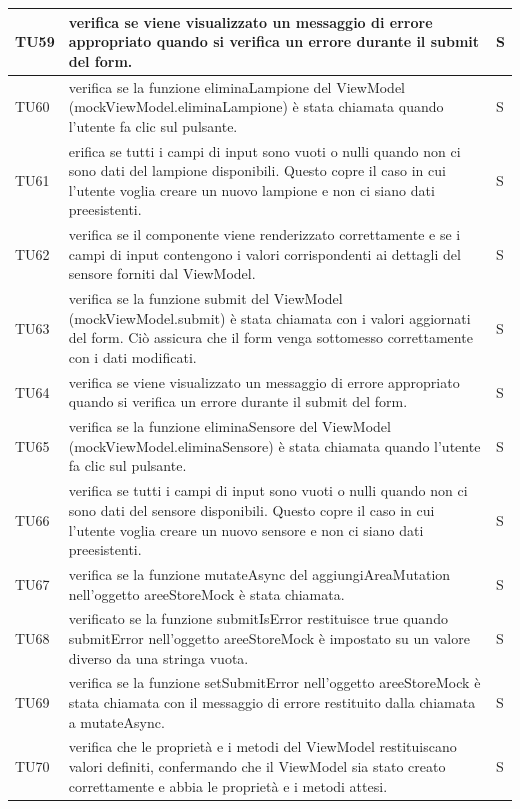 \documentclass[12pt]{article}
\begin{document}
\begin{xltabular}{\linewidth}{|>{\hsize}X|X|>{\hsize}X|}
	TU59 & verifica se viene visualizzato un messaggio di errore appropriato quando si verifica un errore durante il submit del form. & S \\ \hline
	TU60 & verifica se la funzione eliminaLampione del ViewModel (mockViewModel.eliminaLampione) è stata chiamata quando l'utente fa clic sul pulsante. & S \\ \hline
	TU61 & erifica se tutti i campi di input sono vuoti o nulli quando non ci sono dati del lampione disponibili. Questo copre il caso in cui l'utente voglia creare un nuovo lampione e non ci siano dati preesistenti. & S \\ \hline
	TU62 & verifica se il componente viene renderizzato correttamente e se i campi di input contengono i valori corrispondenti ai dettagli del sensore forniti dal ViewModel. & S \\ \hline
	TU63 &  verifica se la funzione submit del ViewModel (mockViewModel.submit) è stata chiamata con i valori aggiornati del form. Ciò assicura che il form venga sottomesso correttamente con i dati modificati. & S \\ \hline
	TU64 & verifica se viene visualizzato un messaggio di errore appropriato quando si verifica un errore durante il submit del form. & S \\ \hline
	TU65 & verifica se la funzione eliminaSensore del ViewModel (mockViewModel.eliminaSensore) è stata chiamata quando l'utente fa clic sul pulsante. & S \\ \hline
	TU66 & verifica se tutti i campi di input sono vuoti o nulli quando non ci sono dati del sensore disponibili. Questo copre il caso in cui l'utente voglia creare un nuovo sensore e non ci siano dati preesistenti. & S \\ \hline
	TU67 & verifica se la funzione mutateAsync del aggiungiAreaMutation nell'oggetto areeStoreMock è stata chiamata. & S \\ \hline
	TU68 & verificato se la funzione submitIsError restituisce true quando submitError nell'oggetto areeStoreMock è impostato su un valore diverso da una stringa vuota. & S \\ \hline
	TU69 & verifica se la funzione setSubmitError nell'oggetto areeStoreMock è stata chiamata con il messaggio di errore restituito dalla chiamata a mutateAsync. & S \\ \hline
	TU70 & verifica che le proprietà e i metodi del ViewModel restituiscano valori definiti, confermando che il ViewModel sia stato creato correttamente e abbia le proprietà e i metodi attesi. & S \\ \hline

\end{xltabular}
\end{document}

